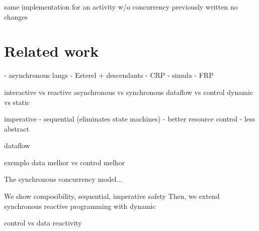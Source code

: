 \documentclass{acm_proc_article-sp}
\newcommand{\1}{\;}
\newcommand{\2}{\;\;}
\newcommand{\3}{\;\;\;}
\newcommand{\5}{\;\;\;\;\;}
\begin{document}
same implementation for an activity w/o concurrency
previously written
no changes

\section{Related work}

- asynchronous langs
- Esterel + descendants
- CRP
- simula
- FRP

interactive  vs reactive
asynchronous vs synchronous
dataflow vs control
dynamic vs static

imperative
    - sequential (eliminates state machines)
    - better resource control
    - less abstract

dataflow

exemplo data melhor vs control melhor

The synchronous concurrency model...

We show composibility, sequential, imperative
safety
Then, we extend synchronous reactive programming with dynamic

control vs data reactivity
\end{document}
